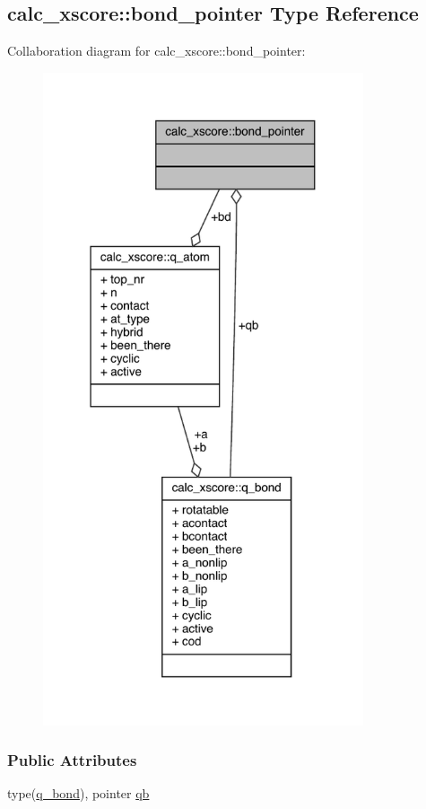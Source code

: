 \hypertarget{structcalc__xscore_1_1bond__pointer}{\subsection{calc\-\_\-xscore\-:\-:bond\-\_\-pointer Type Reference}
\label{structcalc__xscore_1_1bond__pointer}
}


Collaboration diagram for calc\-\_\-xscore\-:\-:bond\-\_\-pointer\-:
\nopagebreak
\begin{figure}[H]
\begin{center}
\leavevmode
\includegraphics[width=268pt]{structcalc__xscore_1_1bond__pointer__coll__graph}
\end{center}
\end{figure}
\subsubsection*{Public Attributes}
\begin{DoxyCompactItemize}
\item 
type(\hyperlink{structcalc__xscore_1_1q__bond}{q\-\_\-bond}), pointer \hyperlink{structcalc__xscore_1_1bond__pointer_ae75b8ebbda1abad5fed29b4f4ff6ad77}{qb}
\end{DoxyCompactItemize}


